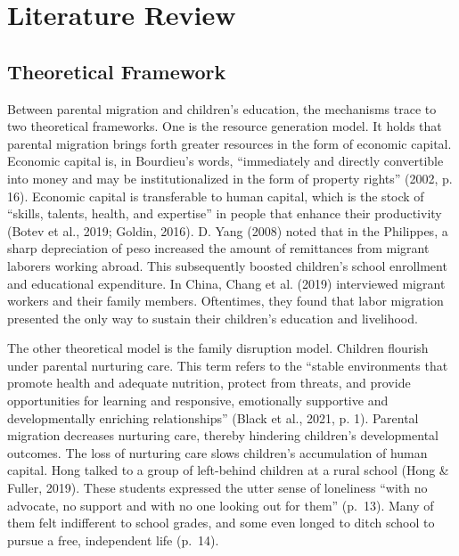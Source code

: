 \documentclass[
  man,floatsintext]{apa7}
\begin{document}
\newpage

\hypertarget{literature-review}{%
\section{Literature Review}\label{literature-review}}

\hypertarget{theoretical-framework}{%
\subsection{Theoretical Framework}\label{theoretical-framework}}

Between parental migration and children's education, the mechanisms trace to two theoretical frameworks. One is the resource generation model. It holds that parental migration brings forth greater resources in the form of economic capital. Economic capital is, in Bourdieu's words, ``immediately and directly convertible into money and may be institutionalized in the form of property rights'' (2002, p. 16). Economic capital is transferable to human capital, which is the stock of ``skills, talents, health, and expertise'' in people that enhance their productivity (Botev et al., 2019; Goldin, 2016). D. Yang (2008) noted that in the Philippes, a sharp depreciation of peso increased the amount of remittances from migrant laborers working abroad. This subsequently boosted children's school enrollment and educational expenditure. In China, Chang et al. (2019) interviewed migrant workers and their family members. Oftentimes, they found that labor migration presented the only way to sustain their children's education and livelihood.

The other theoretical model is the family disruption model. Children flourish under parental nurturing care. This term refers to the ``stable environments that promote health and adequate nutrition, protect from threats, and provide opportunities for learning and responsive, emotionally supportive and developmentally enriching relationships'' (Black et al., 2021, p. 1). Parental migration decreases nurturing care, thereby hindering children's developmental outcomes. The loss of nurturing care slows children's accumulation of human capital. Hong talked to a group of left-behind children at a rural school (Hong \& Fuller, 2019). These students expressed the utter sense of loneliness ``with no advocate, no support and with no one looking out for them'' (p.~13). Many of them felt indifferent to school grades, and some even longed to ditch school to pursue a free, independent life (p.~14).
\end{document}
